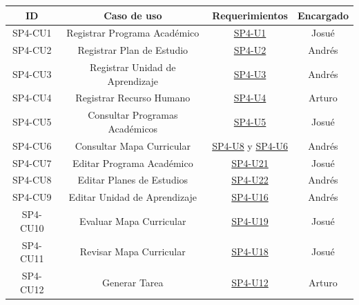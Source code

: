 \begin{center}
	\begin{tabular}{|c|c|c|c|}
		\hline
		ID         & Caso de uso                        & Requerimientos                                           & Encargado \\ \hline
        SP4-CU1    & Registrar Programa Académico       & \hyperref[SP4-U1]{SP4-U1}                                & Josué \\ \hline
        SP4-CU2    & Registrar Plan de Estudio          & \hyperref[SP4-U2]{SP4-U2}                                & Andrés \\ \hline
        SP4-CU3    & Registrar Unidad de Aprendizaje    & \hyperref[SP4-U3]{SP4-U3}                                & Andrés \\ \hline
        SP4-CU4    & Registrar Recurso Humano           & \hyperref[SP4-U4]{SP4-U4}                                & Arturo \\ \hline
        SP4-CU5    & Consultar Programas Académicos     & \hyperref[SP4-U5]{SP4-U5}                                & Josué \\ \hline
        SP4-CU6    & Consultar Mapa Curricular          & \hyperref[SP4-U8]{SP4-U8} y \hyperref[SP4-U6]{SP4-U6}    & Andrés \\ \hline
        SP4-CU7    & Editar Programa Académico          & \hyperref[SP4-U21]{SP4-U21}                              & Josué \\ \hline
        SP4-CU8    & Editar Planes de Estudios          & \hyperref[SP4-U22]{SP4-U22}                              & Andrés \\ \hline
        SP4-CU9    & Editar Unidad de Aprendizaje       & \hyperref[SP4-U16]{SP4-U16}                              & Andrés \\ \hline
        SP4-CU10   & Evaluar Mapa Curricular            & \hyperref[SP4-U19]{SP4-U19}                              & Josué \\ \hline
        SP4-CU11   & Revisar Mapa Curricular            & \hyperref[SP4-U18]{SP4-U18}                              & Josué \\ \hline
        SP4-CU12   & Generar Tarea                      & \hyperref[SP4-U12]{SP4-U12}                              & Arturo \\ \hline
    \end{tabular}
\end{center}
